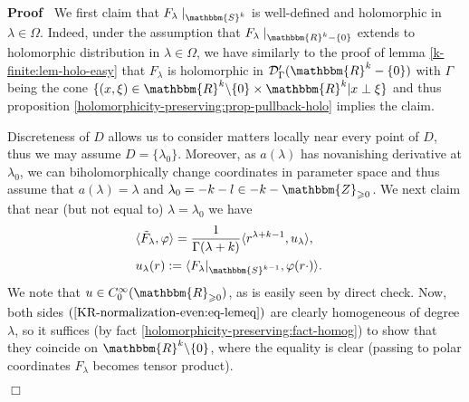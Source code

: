 \documentclass{article}
\newcommand{\assign}{:=}
\renewenvironment{proof}{\noindent\textbf{Proof\ }}{\hspace*{\fill}$\Box$\medskip}
\theoremstyle{remark}
\begin{document}
\begin{proof}
  We first claim that $F_{\lambda} \mid_{\mathbbm{S}^k}$ is well-defined
  and holomorphic in $\lambda \in \Omega$. Indeed, under the assumption that
  $F_{\lambda} \mid_{\mathbbm{R}^k - \{ 0 \}}$ extends to holomorphic
  distribution in $\lambda \in \Omega$, we have similarly to the proof of
  lemma \ref{k-finite:lem-holo-easy} that $F_{\lambda}$ is holomorphic in
  $\mathcal{D}'_{\Gamma} (\mathbbm{R}^k - \{ 0 \})$ with $\Gamma$ being the
  cone $\{ (x, \xi) \in \mathbbm{R}^k \backslash \{ 0 \} \times \mathbbm{R}^k
  | x \perp \xi \}$ and thus proposition
  \ref{holomorphicity-preserving:prop-pullback-holo} implies the claim.
  
  Discreteness of $D$ allows us to consider matters locally near every point
  of $D$, thus we may assume $D = \{ \lambda_0 \}$. Moreover, as $a (\lambda)$
  has novanishing derivative at $\lambda_0$, we can biholomorphically change
  coordinates in parameter space and thus assume that $a (\lambda) = \lambda$
  and $\lambda_0 = - k - l \in - k -\mathbbm{Z}_{\geqslant 0}$. We next claim
  that near (but not equal to) $\lambda = \lambda_0$ we have
  \begin{eqnarray}
    & \langle \tilde{F}_{\lambda}, \varphi \rangle = \frac{1}{\Gamma (\lambda
    + k)} \langle r^{\lambda + k - 1}, u_{\lambda} \rangle, 
    \label{KR-normalization-even:eq-lemeq} & \\
    & u_{\lambda} (r) \assign \langle F_{\lambda} |_{\mathbbm{S}^{k - 1}},
    \varphi (r \cdot) \rangle . &  \nonumber
  \end{eqnarray}
  We note that $u \in C^{\infty}_0 (\mathbbm{R}_{\geqslant 0})$, as is easily
  seen by direct check. Now, both sides
  $(\ref{KR-normalization-even:eq-lemeq})$ are clearly homogeneous of degree
  $\lambda$, so it suffices (by fact
  \ref{holomorphicity-preserving:fact-homog}) to show that they coincide on
  $\mathbbm{R}^k \backslash \{ 0 \}$, where the equality is clear (passing to
  polar coordinates $F_{\lambda}$ becomes tensor product).
  

\end{proof}
\end{document}
